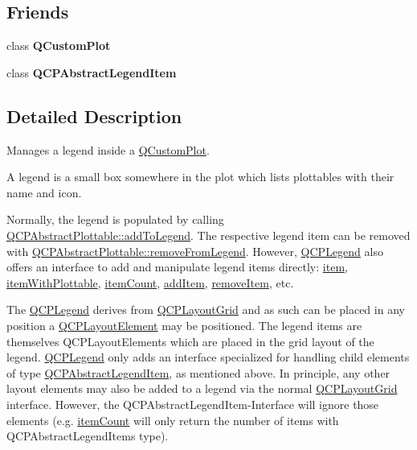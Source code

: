 \subsection*{Friends}
\begin{DoxyCompactItemize}
\item 
\hypertarget{class_q_c_p_legend_a1cdf9df76adcfae45261690aa0ca2198}{}\label{class_q_c_p_legend_a1cdf9df76adcfae45261690aa0ca2198} 
class {\bfseries Q\+Custom\+Plot}
\item 
\hypertarget{class_q_c_p_legend_a8a375e31e42c68de049fcf0fd35db5b0}{}\label{class_q_c_p_legend_a8a375e31e42c68de049fcf0fd35db5b0} 
class {\bfseries Q\+C\+P\+Abstract\+Legend\+Item}
\end{DoxyCompactItemize}


\subsection{Detailed Description}
Manages a legend inside a \hyperlink{class_q_custom_plot}{Q\+Custom\+Plot}. 

A legend is a small box somewhere in the plot which lists plottables with their name and icon.

Normally, the legend is populated by calling \hyperlink{class_q_c_p_abstract_plottable_a70f8cabfd808f7d5204b9f18c45c13f5}{Q\+C\+P\+Abstract\+Plottable\+::add\+To\+Legend}. The respective legend item can be removed with \hyperlink{class_q_c_p_abstract_plottable_ac95fb2604d9106d0852ad9ceb326fe8c}{Q\+C\+P\+Abstract\+Plottable\+::remove\+From\+Legend}. However, \hyperlink{class_q_c_p_legend}{Q\+C\+P\+Legend} also offers an interface to add and manipulate legend items directly\+: \hyperlink{class_q_c_p_legend_acfe9694c45104a3359d3806ed366fcf7}{item}, \hyperlink{class_q_c_p_legend_a91e790002d8bf15a20628a8e8841e397}{item\+With\+Plottable}, \hyperlink{class_q_c_p_legend_a57ab86ab8b2a3762d4c1455eb5452c88}{item\+Count}, \hyperlink{class_q_c_p_legend_a3ab274de52d2951faea45a6d975e6b3f}{add\+Item}, \hyperlink{class_q_c_p_legend_ac91595c3eaa746fe6321d2eb952c63bb}{remove\+Item}, etc.

The \hyperlink{class_q_c_p_legend}{Q\+C\+P\+Legend} derives from \hyperlink{class_q_c_p_layout_grid}{Q\+C\+P\+Layout\+Grid} and as such can be placed in any position a \hyperlink{class_q_c_p_layout_element}{Q\+C\+P\+Layout\+Element} may be positioned. The legend items are themselves Q\+C\+P\+Layout\+Elements which are placed in the grid layout of the legend. \hyperlink{class_q_c_p_legend}{Q\+C\+P\+Legend} only adds an interface specialized for handling child elements of type \hyperlink{class_q_c_p_abstract_legend_item}{Q\+C\+P\+Abstract\+Legend\+Item}, as mentioned above. In principle, any other layout elements may also be added to a legend via the normal \hyperlink{class_q_c_p_layout_grid}{Q\+C\+P\+Layout\+Grid} interface. However, the Q\+C\+P\+Abstract\+Legend\+Item-\/\+Interface will ignore those elements (e.\+g. \hyperlink{class_q_c_p_legend_a57ab86ab8b2a3762d4c1455eb5452c88}{item\+Count} will only return the number of items with Q\+C\+P\+Abstract\+Legend\+Items type).

